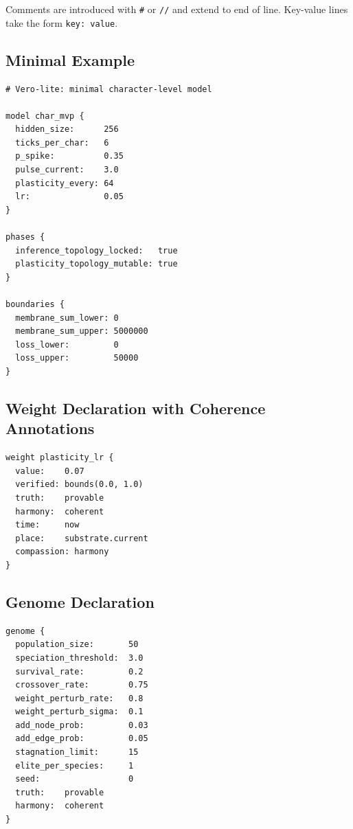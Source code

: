 \documentclass[11pt,a4paper]{article}
\begin{document}
Comments are introduced with \texttt{\#} or \texttt{//} and extend to end of line.
Key-value lines take the form \texttt{key: value}.

\subsection{Minimal Example}

\begin{lstlisting}[language=Vero, caption={Minimal Vero program specifying a spiking network configuration.}]
# Vero-lite: minimal character-level model

model char_mvp {
  hidden_size:      256
  ticks_per_char:   6
  p_spike:          0.35
  pulse_current:    3.0
  plasticity_every: 64
  lr:               0.05
}

phases {
  inference_topology_locked:   true
  plasticity_topology_mutable: true
}

boundaries {
  membrane_sum_lower: 0
  membrane_sum_upper: 5000000
  loss_lower:         0
  loss_upper:         50000
}
\end{lstlisting}

\subsection{Weight Declaration with Coherence Annotations}

\begin{lstlisting}[language=Vero, caption={Weight declaration with full coherence annotation. A value outside declared bounds, or an unprovable value claiming coherent harmony, will not compile.}]
weight plasticity_lr {
  value:    0.07
  verified: bounds(0.0, 1.0)
  truth:    provable
  harmony:  coherent
  time:     now
  place:    substrate.current
  compassion: harmony
}
\end{lstlisting}

\subsection{Genome Declaration}

\begin{lstlisting}[language=Vero, caption={Genome block specifying evolutionary search parameters.}]
genome {
  population_size:       50
  speciation_threshold:  3.0
  survival_rate:         0.2
  crossover_rate:        0.75
  weight_perturb_rate:   0.8
  weight_perturb_sigma:  0.1
  add_node_prob:         0.03
  add_edge_prob:         0.05
  stagnation_limit:      15
  elite_per_species:     1
  seed:                  0
  truth:    provable
  harmony:  coherent
}
\end{lstlisting}
\end{document}
